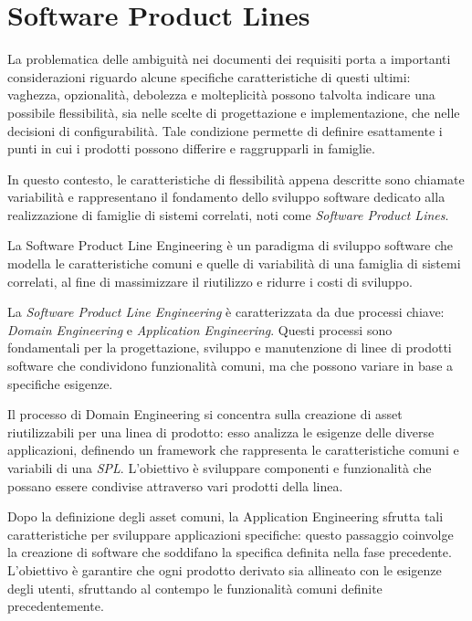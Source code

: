 \documentclass[12pt]{report}
\newcommand{\torevise}[1]{\textcolor{red}{#1}}
\newcommand{\spl}{\textsl{SPL}\xspace}
\begin{document}
\section{Software Product Lines}
\label{sec:spl}
La problematica delle ambiguità nei documenti dei requisiti porta a importanti considerazioni riguardo alcune specifiche caratteristiche di questi ultimi: vaghezza, opzionalità, debolezza e molteplicità possono talvolta indicare una possibile flessibilità, sia nelle scelte di progettazione e implementazione, che nelle decisioni di configurabilità. Tale condizione permette di definire esattamente i punti in cui i prodotti possono differire e raggrupparli in famiglie.

In questo contesto, le caratteristiche di flessibilità appena descritte sono chiamate variabilità e rappresentano il fondamento dello sviluppo software dedicato alla realizzazione di famiglie di sistemi correlati, noti come \textit{Software Product Lines}.

\begin{mdframed}
\small
La \textsf{Software Product Line Engineering} è un paradigma di sviluppo software che modella le caratteristiche comuni e quelle di variabilità di una famiglia di sistemi correlati, al fine di massimizzare il riutilizzo e ridurre i costi di sviluppo.
\end{mdframed}

La \textit{Software Product Line Engineering} è caratterizzata da due processi chiave: \textit{Domain Engineering} e \textit{Application Engineering}. Questi processi sono fondamentali per la progettazione, sviluppo e manutenzione di linee di prodotti software che condividono funzionalità comuni, ma che possono variare in base a specifiche esigenze.

Il processo di \textsf{Domain Engineering} si concentra sulla creazione di asset riutilizzabili per una linea di prodotto: esso analizza le esigenze delle diverse applicazioni, definendo un framework che rappresenta le caratteristiche comuni e variabili di una \spl. L'obiettivo è sviluppare componenti e funzionalità che possano essere condivise attraverso vari prodotti della linea.

Dopo la definizione degli asset comuni, la \textsf{Application Engineering} sfrutta tali caratteristiche per sviluppare applicazioni specifiche: questo passaggio coinvolge la creazione di software che soddifano la specifica definita nella fase precedente. L'obiettivo è garantire che ogni prodotto derivato sia allineato con le esigenze degli utenti, sfruttando al contempo le funzionalità comuni definite precedentemente.
\end{document}
